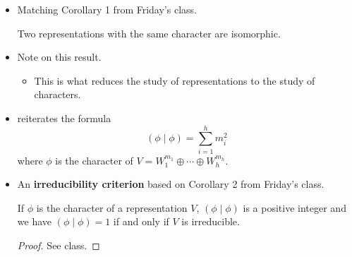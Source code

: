\documentclass[../notes.tex]{subfiles}
\begin{document}
\begin{itemize}
\begin{corollary}
    \end{corollary}
    \item Matching Corollary 1 from Friday's class.
    \begin{corollary}
        Two representations with the same character are isomorphic.
    \end{corollary}
    \item Note on this result.
    \begin{itemize}
        \item This is what reduces the study of representations to the study of characters.
    \end{itemize}
    \item \textcite{bib:Serre} reiterates the formula
    \begin{equation*}
        (\phi\mid\phi) = \sum_{i=1}^hm_i^2
    \end{equation*}
    where $\phi$ is the character of $V=W_1^{m_1}\oplus\cdots\oplus W_h^{m_h}$.
    \item An \textbf{irreducibility criterion} based on Corollary 2 from Friday's class.
    \begin{theorem}\label{trm:irrepCriterion}
        If $\phi$ is the character of a representation $V$, $(\phi\mid\phi)$ is a positive integer and we have $(\phi\mid\phi)=1$ if and only if $V$ is irreducible.
        \begin{proof}
            See class.
        \end{proof}
    \end{theorem}
\end{itemize}
\end{document}
